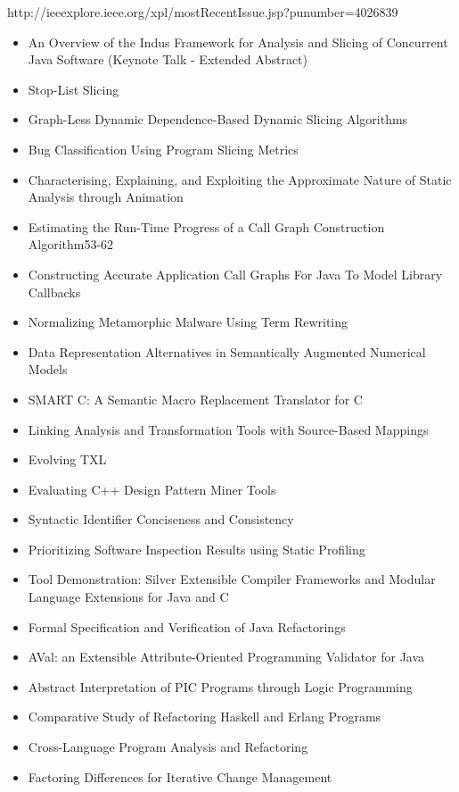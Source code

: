 http://ieeexplore.ieee.org/xpl/mostRecentIssue.jsp?punumber=4026839

{\small
\begin{itemize}[itemsep=-1ex]
  \item An Overview of the Indus Framework for Analysis and Slicing of Concurrent Java Software (Keynote Talk - Extended Abstract)
  \item Stop-List Slicing
  \item Graph-Less Dynamic Dependence-Based Dynamic Slicing Algorithms
  \item Bug Classification Using Program Slicing Metrics
  \item Characterising, Explaining, and Exploiting the Approximate Nature of Static Analysis through Animation
  \item Estimating the Run-Time Progress of a Call Graph Construction Algorithm53-62
  \item Constructing Accurate Application Call Graphs For Java To Model Library Callbacks
  \item Normalizing Metamorphic Malware Using Term Rewriting
  \item Data Representation Alternatives in Semantically Augmented Numerical Models
  \item SMART C: A Semantic Macro Replacement Translator for C
  \item Linking Analysis and Transformation Tools with Source-Based Mappings
  \item Evolving TXL
  \item Evaluating C++ Design Pattern Miner Tools
  \item Syntactic Identifier Conciseness and Consistency
  \item Prioritizing Software Inspection Results using Static Profiling
  \item Tool Demonstration: Silver Extensible Compiler Frameworks and Modular Language Extensions for Java and C
  \item Formal Specification and Verification of Java Refactorings
  \item AVal: an Extensible Attribute-Oriented Programming Validator for Java
  \item Abstract Interpretation of PIC Programs through Logic Programming
  \item Comparative Study of Refactoring Haskell and Erlang Programs
  \item Cross-Language Program Analysis and Refactoring
  \item Factoring Differences for Iterative Change Management
\end{itemize}
}

